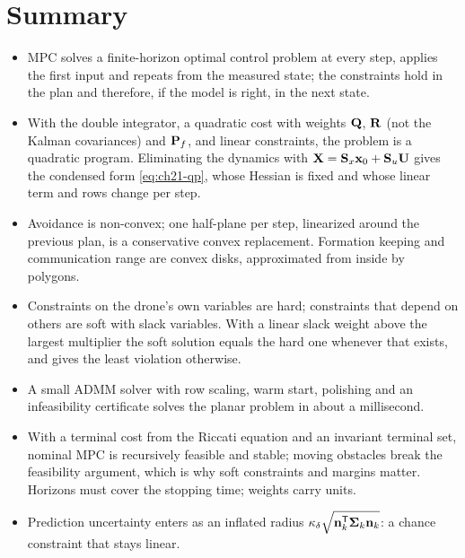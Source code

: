 \section{Summary}
\begin{summary}
\begin{itemize}
  \item MPC solves a finite-horizon optimal control problem at every step,
  applies the first input and repeats from the measured state; the constraints
  hold in the plan and therefore, if the model is right, in the next state.
  \item With the double integrator, a quadratic cost with weights $\mathbf{Q}$,
  $\mathbf{R}$ (not the Kalman covariances) and $\mathbf{P}_f$, and linear
  constraints, the problem is a quadratic program. Eliminating the dynamics
  with $\mathbf{X}=\mathbf{S}_x\mathbf{x}_0+\mathbf{S}_u\mathbf{U}$ gives the condensed form
  \cref{eq:ch21-qp}, whose Hessian is fixed and whose linear term and rows
  change per step.
  \item Avoidance is non-convex; one half-plane per step, linearized around the
  previous plan, is a conservative convex replacement. Formation keeping and
  communication range are convex disks, approximated from inside by polygons.
  \item Constraints on the drone's own variables are hard; constraints that
  depend on others are soft with slack variables. With a linear slack weight
  above the largest multiplier the soft solution equals the hard one whenever
  that exists, and gives the least violation otherwise.
  \item A small ADMM solver with row scaling, warm start, polishing and an
  infeasibility certificate solves the planar problem in about a millisecond.
  \item With a terminal cost from the Riccati equation and an invariant
  terminal set, nominal MPC is recursively feasible and stable; moving
  obstacles break the feasibility argument, which is why soft constraints and
  margins matter. Horizons must cover the stopping time; weights carry units.
  \item Prediction uncertainty enters as an inflated radius
  $\kappa_\delta\sqrt{\mathbf{n}_k^{\mathsf{T}}\mathbf{\Sigma}_k\mathbf{n}_k}$: a chance
  constraint that stays linear.
\end{itemize}
\end{summary}

